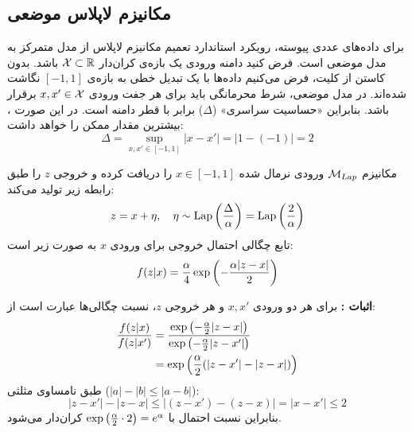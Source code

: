 \subsection{مکانیزم لاپلاس موضعی}
\label{sec:ldp:laplace}

برای داده‌های عددی پیوسته، رویکرد استاندارد تعمیم مکانیزم لاپلاس از مدل متمرکز به مدل موضعی است. فرض کنید دامنه ورودی یک بازه‌ی کران‌دار $\Xset \subset \mathbb{R}$ باشد.
بدون کاستن از کلیت، فرض می‌کنیم داده‌ها با یک تبدیل خطی به بازه‌ی $[-1, 1]$ نگاشت شده‌اند.
در مدل موضعی، شرط محرمانگی باید برای هر جفت ورودی $x, x' \in \Xset$ برقرار باشد. بنابراین «حساسیت سراسری» ($\Delta$) برابر با قطر دامنه است. در این صورت \Del، بیشترین مقدار ممکن را خواهد داشت:
\begin{equation}
\Delta = \sup_{x, x' \in [-1, 1]} |x - x'| = |1 - (-1)| = 2
\end{equation}

\begin{تعریف}
مکانیزم $\mech_{Lap}$ ورودی نرمال شده $x \in [-1, 1]$ را دریافت کرده و خروجی $z$ را طبق رابطه زیر تولید می‌کند:
\begin{equation}
z = x + \eta, \quad \eta \sim \mathrm{Lap}\left( \frac{\Delta}{\alpha} \right) = \mathrm{Lap}\left( \frac{2}{\alpha} \right)
\end{equation}
تابع چگالی احتمال  خروجی برای ورودی $x$ به صورت زیر است:
\begin{equation}
f(z|x) = \frac{\alpha}{4} \exp\left( -\frac{\alpha |z-x|}{2} \right)
\end{equation}
\end{تعریف}

\textbf{اثبات \LDP:}
برای هر دو ورودی $x, x'$ و هر خروجی $z$، نسبت چگالی‌ها عبارت است از:
\begin{align}
\frac{f(z|x)}{f(z|x')} &= \frac{\exp\left(-\frac{\alpha}{2}|z-x|\right)}{\exp\left(-\frac{\alpha}{2}|z-x'|\right)} \\
&= \exp\left( \frac{\alpha}{2} (|z-x'| - |z-x|) \right)
\end{align}
طبق نامساوی مثلثی ($|a| - |b| \le |a-b|$):
\[
|z-x'| - |z-x| \le |(z-x') - (z-x)| = |x-x'| \le 2
\]
بنابراین نسبت احتمال با $\exp\left(\frac{\alpha}{2} \cdot 2\right) = e^{\alpha}$ کران‌دار می‌شود.

